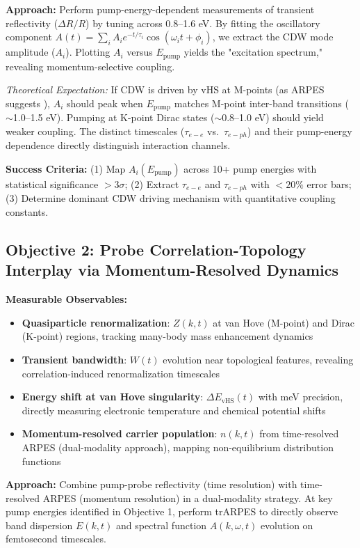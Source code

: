 \documentclass[12pt,a4paper]{article}
\begin{document}
\textbf{Approach:} Perform pump-energy-dependent measurements of transient reflectivity ($\Delta R/R$) by tuning across 0.8--1.6 eV. By fitting the oscillatory component $A(t) = \sum_{i} A_i e^{-t/\tau_i} \cos(\omega_i t + \phi_i)$, we extract the CDW mode amplitude ($A_i$). Plotting $A_i$ versus $E_{\text{pump}}$ yields the "excitation spectrum," revealing momentum-selective coupling.

\textit{Theoretical Expectation:} If CDW is driven by vHS at M-points (as ARPES suggests \cite{Kang2022}), $A_i$ should peak when $E_{\text{pump}}$ matches M-point inter-band transitions ($\sim$1.0--1.5 eV). Pumping at K-point Dirac states ($\sim$0.8--1.0 eV) should yield weaker coupling. The distinct timescales ($\tau_{e-e}$ vs.~$\tau_{e-ph}$) and their pump-energy dependence directly distinguish interaction channels.

\textbf{Success Criteria:} (1) Map $A_i(E_{\text{pump}})$ across 10+ pump energies with statistical significance $>3\sigma$; (2) Extract $\tau_{e-e}$ and $\tau_{e-ph}$ with $<20\%$ error bars; (3) Determine dominant CDW driving mechanism with quantitative coupling constants.

\subsection{Objective 2: Probe Correlation-Topology Interplay via Momentum-Resolved Dynamics}

\textbf{Measurable Observables:}
\begin{itemize}
    \item \textbf{Quasiparticle renormalization}: $Z(k,t)$ at van Hove (M-point) and Dirac (K-point) regions, tracking many-body mass enhancement dynamics
    \item \textbf{Transient bandwidth}: $W(t)$ evolution near topological features, revealing correlation-induced renormalization timescales
    \item \textbf{Energy shift at van Hove singularity}: $\Delta E_{\text{vHS}}(t)$ with meV precision, directly measuring electronic temperature and chemical potential shifts
    \item \textbf{Momentum-resolved carrier population}: $n(k,t)$ from time-resolved ARPES (dual-modality approach), mapping non-equilibrium distribution functions
\end{itemize}

\textbf{Approach:} Combine pump-probe reflectivity (time resolution) with time-resolved ARPES (momentum resolution) in a dual-modality strategy. At key pump energies identified in Objective 1, perform trARPES to directly observe band dispersion $E(k,t)$ and spectral function $A(k,\omega,t)$ evolution on femtosecond timescales.
\end{document}
